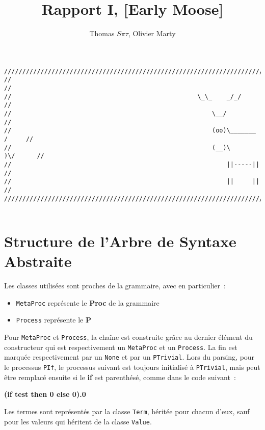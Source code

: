 \documentclass[11pt]{article} %
\title{Rapport I,  [Early Moose]}
\author{Thomas $S\pi\tau$, Olivier Marty}
\begin{document}
\maketitle

\begin{verbatim}
////////////////////////////////////////////////////////////////////////////////
//                                                                            //
//                                                   \_\_    _/_/             //
//                                                       \__/                 //
//                                                       (oo)\_______   /     //
//                                                       (__)\       )\/      //
//                                                           ||-----||        //
//                                                           ||     ||        //
////////////////////////////////////////////////////////////////////////////////  


\end{verbatim}
\section{Structure de l'Arbre de Syntaxe Abstraite}

Les classes utilisées sont proches de la grammaire, avec en particulier~:
\begin{itemize}
 \item  \texttt{MetaProc} représente le \textbf{Proc} de la grammaire
 \item  \texttt{Process} représente le \textbf{P}
\end{itemize}

Pour \texttt{MetaProc} et \texttt{Process}, la chaîne est construite grâce au dernier élément du constructeur qui est respectivement un \texttt{MetaProc} et un \texttt{Process}. La fin est marquée respectivement par un \texttt{None} et par un \texttt{PTrivial}.
Lors du parsing, pour le processus \texttt{PIf}, le processus suivant est toujours initialisé à \texttt{PTrivial}, mais peut être remplacé ensuite si le \textbf{if} est parenthésé, comme dans le code suivant~:
\begin{center}
 \textbf{(if test then 0 else 0).0}
\end{center}

Les termes sont représentés par la classe \texttt{Term}, héritée pour chacun d'eux, sauf pour les valeurs qui héritent de la classe \texttt{Value}.
\end{document}
